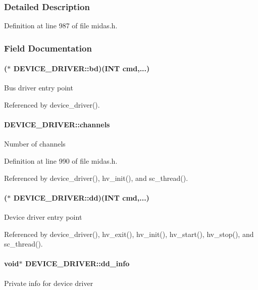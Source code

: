 \subsubsection{Detailed Description}


Definition at line 987 of file midas.h.

\subsubsection{Field Documentation}
\paragraph[{bd}]{($\ast$ {\bf DEVICE\_\-DRIVER::bd})({\bf INT} cmd,...)}\hfill\label{structDEVICE__DRIVER_a885e46846e92facb6222f6a430127772}
Bus driver entry point 

Referenced by device\_\-driver().
\paragraph[{channels}]{ {\bf DEVICE\_\-DRIVER::channels}}\hfill\label{structDEVICE__DRIVER_a1451258cb714852eef78ec04e7970f65}
Number of channels 

Definition at line 990 of file midas.h.

Referenced by device\_\-driver(), hv\_\-init(), and sc\_\-thread().
\paragraph[{dd}]{($\ast$ {\bf DEVICE\_\-DRIVER::dd})({\bf INT} cmd,...)}\hfill\label{structDEVICE__DRIVER_adfdb7ee99dd506e35f65d3f8d4b41a4b}
Device driver entry point 

Referenced by device\_\-driver(), hv\_\-exit(), hv\_\-init(), hv\_\-start(), hv\_\-stop(), and sc\_\-thread().
\paragraph[{dd\_\-info}]{\setlength{\rightskip}{0pt plus 5cm}void$\ast$ {\bf DEVICE\_\-DRIVER::dd\_\-info}}\hfill\label{structDEVICE__DRIVER_a334e4f80981fd4d70bb6ebea2fe3e911}
Private info for device driver 

